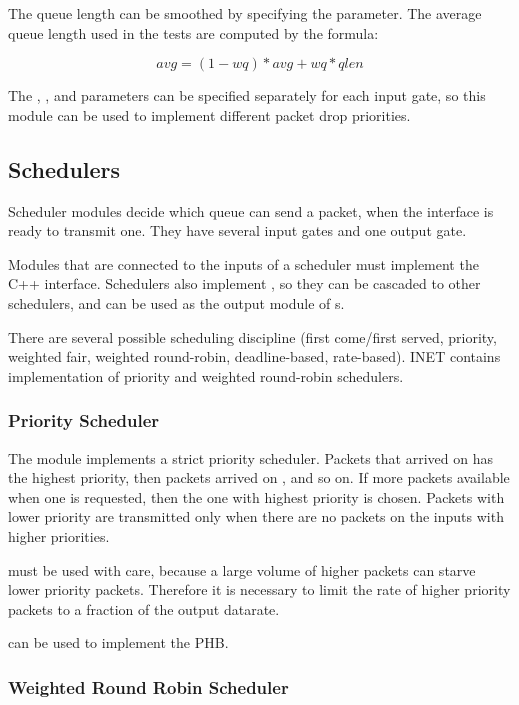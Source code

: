 The queue length can be smoothed by specifying the 
parameter. The average queue length used in the tests
are computed by the formula:

 $$avg = (1-wq)*avg + wq*qlen$$

The , , and  parameters
can be specified separately for each input gate, so this module
can be used to implement different packet drop priorities.

\subsection{Schedulers}

Scheduler modules decide which queue can send a packet, when the
interface is ready to transmit one. They have several input gates
and one output gate.

Modules that are connected to the inputs of a scheduler must
implement the  C++ interface.
Schedulers also implement , so
they can be cascaded to other schedulers, and can be used
as the output module of s.

There are several possible scheduling discipline (first come/first served,
priority, weighted fair, weighted round-robin, deadline-based,
rate-based). INET contains implementation
of priority and weighted round-robin schedulers.

\subsubsection{Priority Scheduler}

The  module implements a strict priority
scheduler. Packets that arrived on  has the highest priority,
then packets arrived on , and so on. If more packets
available when one is requested, then the one with highest priority
is chosen. Packets with lower priority are transmitted only when
there are no packets on the inputs with higher priorities.

 must be used with care, because a
large volume of higher packets can starve lower priority packets.
Therefore it is necessary to limit the rate of higher priority
packets to a fraction of the output datarate.

 can be used to implement
the  PHB.

\subsubsection*{Weighted Round Robin Scheduler}

